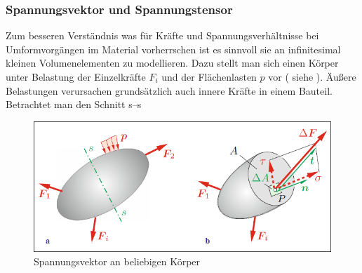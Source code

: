 \documentclass[12pt,a4paper,parskip,twoside,BCOR5mm,headsepline]{scrartcl}
\begin{document}
\begin{description*}
\subsubsection{Spannungsvektor und Spannungstensor}
Zum besseren Verständnis was für Kräfte und Spannungsverhältnisse bei Umformvorgängen im Material vorherrschen ist es sinnvoll sie an infinitesimal kleinen Volumenelementen zu modellieren. Dazu stellt man sich einen Körper unter Belastung der Einzelkräfte $ F_i $ und der Flächenlasten $ p $  vor ( siehe ). Äußere Belastungen verursachen grundsätzlich auch innere Kräfte in einem Bauteil. Betrachtet man den Schnitt s--s \begin{figure}
  \centering
  \includegraphics[width=.8\textwidth]{normalvektor}
  \caption[Spannungsvektor am Körper]{Spannungsvektor an beliebigen Körper\autocite[43]{tmr}}
  \label{fig:normalvektor}
  \end{figure}


\end{description*}
\end{document}
